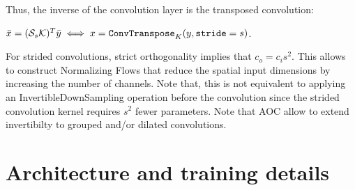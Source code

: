     
    Thus, the inverse of the convolution layer is the transposed convolution:
     
    $\bar{x} = (\mathcal{S}_{s} \mathcal{K})^T \bar{y} \iff x = \mathtt{ConvTranspose}_{K}(y, \mathtt{stride}=s)$.

   
    For strided convolutions, strict orthogonality implies that $c_o=c_is^2$. This allows to construct Normalizing Flows that reduce the spatial input dimensions by increasing  the number of channels. Note that, this is not equivalent to applying an InvertibleDownSampling operation before the convolution since the strided convolution kernel requires $s^2$ fewer parameters. Note that AOC allow to extend invertibilty to grouped and/or dilated convolutions.
    
    
    
\section{Architecture and training details}\label{sec:ap_training_details}

